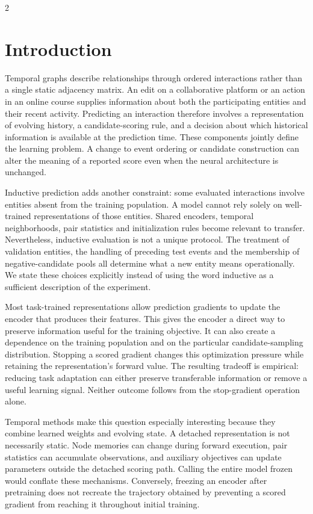 \documentclass[a4paper,10pt]{article}
\begin{document}
\begin{multicols}{2}
\section{Introduction}
Temporal graphs describe relationships through ordered interactions rather than a single static adjacency matrix. An edit on a collaborative platform or an action in an online course supplies information about both the participating entities and their recent activity. Predicting an interaction therefore involves a representation of evolving history, a candidate-scoring rule, and a decision about which historical information is available at the prediction time. These components jointly define the learning problem. A change to event ordering or candidate construction can alter the meaning of a reported score even when the neural architecture is unchanged.

Inductive prediction adds another constraint: some evaluated interactions involve entities absent from the training population. A model cannot rely solely on well-trained representations of those entities. Shared encoders, temporal neighborhoods, pair statistics and initialization rules become relevant to transfer. Nevertheless, inductive evaluation is not a unique protocol. The treatment of validation entities, the handling of preceding test events and the membership of negative-candidate pools all determine what a new entity means operationally. We state these choices explicitly instead of using the word inductive as a sufficient description of the experiment.

Most task-trained representations allow prediction gradients to update the encoder that produces their features. This gives the encoder a direct way to preserve information useful for the training objective. It can also create a dependence on the training population and on the particular candidate-sampling distribution. Stopping a scored gradient changes this optimization pressure while retaining the representation's forward value. The resulting tradeoff is empirical: reducing task adaptation can either preserve transferable information or remove a useful learning signal. Neither outcome follows from the stop-gradient operation alone.

Temporal methods make this question especially interesting because they combine learned weights and evolving state. A detached representation is not necessarily static. Node memories can change during forward execution, pair statistics can accumulate observations, and auxiliary objectives can update parameters outside the detached scoring path. Calling the entire model frozen would conflate these mechanisms. Conversely, freezing an encoder after pretraining does not recreate the trajectory obtained by preventing a scored gradient from reaching it throughout initial training.


\end{multicols}
\end{document}
